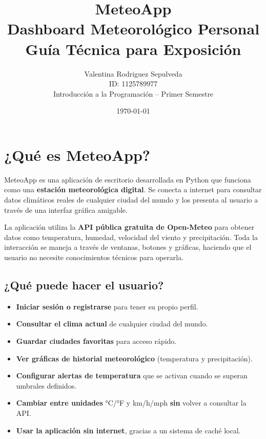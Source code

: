 \documentclass[12pt,a4paper]{article}
\title{\Huge \textbf{MeteoApp}\\[0.3cm]
       \Large Dashboard Meteorológico Personal\\[0.3cm]
       \large Guía Técnica para Exposición}
\author{Valentina Rodriguez Sepulveda\\[0.2cm]
        \small ID: 1125789977\\[0.2cm]
        \small Introducción a la Programación -- Primer Semestre}
\date{\today}
\begin{document}
\maketitle
\thispagestyle{empty}
\newpage

\tableofcontents
\newpage

\section{¿Qué es MeteoApp?}

MeteoApp es una aplicación de escritorio desarrollada en Python que funciona como una \textbf{estación meteorológica digital}. Se conecta a internet para consultar datos climáticos reales de cualquier ciudad del mundo y los presenta al usuario a través de una interfaz gráfica amigable.

La aplicación utiliza la \textbf{API pública gratuita de Open-Meteo} para obtener datos como temperatura, humedad, velocidad del viento y precipitación. Toda la interacción se maneja a través de ventanas, botones y gráficas, haciendo que el usuario no necesite conocimientos técnicos para operarla.

\subsection{¿Qué puede hacer el usuario?}

\begin{itemize}[itemsep=4pt]
    \item \textbf{Iniciar sesión o registrarse} para tener su propio perfil.
    \item \textbf{Consultar el clima actual} de cualquier ciudad del mundo.
    \item \textbf{Guardar ciudades favoritas} para acceso rápido.
    \item \textbf{Ver gráficas de historial meteorológico} (temperatura y precipitación).
    \item \textbf{Configurar alertas de temperatura} que se activan cuando se superan umbrales definidos.
    \item \textbf{Cambiar entre unidades} °C/°F y km/h/mph \textbf{sin} volver a consultar la API.
    \item \textbf{Usar la aplicación sin internet}, gracias a un sistema de caché local.
\end{itemize}
\end{document}

